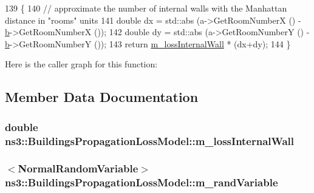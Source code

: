 \begin{DoxyCode}
139 \{
140   \textcolor{comment}{// approximate the number of internal walls with the Manhattan distance in "rooms" units}
141   \textcolor{keywordtype}{double} dx = std::abs (a->GetRoomNumberX () - \hyperlink{buildings__pathloss_8m_a21ad0bd836b90d08f4cf640b4c298e7c}{b}->GetRoomNumberX ());
142   \textcolor{keywordtype}{double} dy = std::abs (a->GetRoomNumberY () - \hyperlink{buildings__pathloss_8m_a21ad0bd836b90d08f4cf640b4c298e7c}{b}->GetRoomNumberY ());    
143   \textcolor{keywordflow}{return} \hyperlink{classns3_1_1BuildingsPropagationLossModel_add1b3e641ff9ad224cfdbb4d3a3db152}{m\_lossInternalWall} * (dx+dy);
144 \}
\end{DoxyCode}


Here is the caller graph for this function\+:




\subsection{Member Data Documentation}
\subsubsection[{\texorpdfstring{m\+\_\+loss\+Internal\+Wall}{m_lossInternalWall}}]{\setlength{\rightskip}{0pt plus 5cm}double ns3\+::\+Buildings\+Propagation\+Loss\+Model\+::m\+\_\+loss\+Internal\+Wall\hspace{0.3cm}{\ttfamily [protected]}}\hypertarget{classns3_1_1BuildingsPropagationLossModel_add1b3e641ff9ad224cfdbb4d3a3db152}{}\label{classns3_1_1BuildingsPropagationLossModel_add1b3e641ff9ad224cfdbb4d3a3db152}
\subsubsection[{\texorpdfstring{m\+\_\+rand\+Variable}{m_randVariable}}]{$<${\bf Normal\+Random\+Variable}$>$ ns3\+::\+Buildings\+Propagation\+Loss\+Model\+::m\+\_\+rand\+Variable\hspace{0.3cm}{\ttfamily [protected]}}\hypertarget{classns3_1_1BuildingsPropagationLossModel_ae3c9b1fdf792660412496302a44661ec}{}\label{classns3_1_1BuildingsPropagationLossModel_ae3c9b1fdf792660412496302a44661ec}
